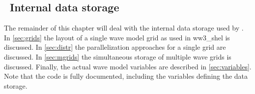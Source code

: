 \vssub
\subsection{~Internal data storage} \label{sec:common}
\vssub

The remainder of this chapter will deal with the internal data storage used by
\ws. In \para\ref{sec:grids} the layout of a single wave model grid as used in
{\file ww3\_shel} is discussed. In \para\ref{sec:distr} the parallelization
approaches for a single grid are discussed. In \para\ref{sec:mgrids} the
simultaneous storage of multiple wave grids is discussed. Finally, the actual
wave model variables are described in \para\ref{sec:variables}. Note that the
code is fully documented, including the variables defining the data storage.
